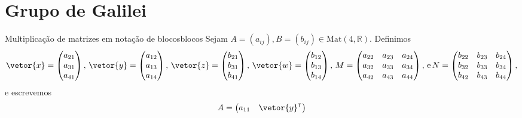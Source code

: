\section{Grupo de Galilei}
\begin{lemma}{Multiplicação de matrizes em notação de blocos}{blocos}
    Sejam \(A = (a_{ij}),B = (b_{ij}) \in \mathrm{Mat}(4, \mathbb{R})\). Definimos
    \begin{equation*}
        \vetor{x} = \begin{pmatrix}
            a_{21}\\
            a_{31}\\
            a_{41}
        \end{pmatrix},\,
        \vetor{y} = \begin{pmatrix}
            a_{12}\\
            a_{13}\\
            a_{14}
        \end{pmatrix},\,
        \vetor{z} = \begin{pmatrix}
            b_{21}\\
            b_{31}\\
            b_{41}
        \end{pmatrix},\,
        \vetor{w} = \begin{pmatrix}
            b_{12}\\
            b_{13}\\
            b_{14}
        \end{pmatrix},\,
        M = \begin{pmatrix}
            a_{22} & a_{23} & a_{24}\\
            a_{32} & a_{33} & a_{34}\\
            a_{42} & a_{43} & a_{44}\\
        \end{pmatrix},\,\text{e}\,
        N = \begin{pmatrix}
            b_{22} & b_{23} & b_{24}\\
            b_{32} & b_{33} & b_{34}\\
                b_{42} & b_{43} & b_{44}\\
            \end{pmatrix},
    \end{equation*}
    e escrevemos
    \begin{equation*}
        A = \begin{pmatrix}
            a_{11} & \vetor{y}^\intercal\\

\end{pmatrix}
\end{equation*}
\end{lemma}
